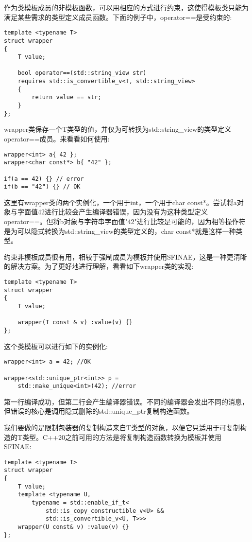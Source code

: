 作为类模板成员的非模板函数，可以用相应的方式进行约束，这使得模板类只能为满足某些需求的类型定义成员函数。下面的例子中，operator==是受约束的:

\begin{lstlisting}[style=styleCXX]
template <typename T>
struct wrapper
{
	T value;
	
	bool operator==(std::string_view str)
	requires std::is_convertible_v<T, std::string_view>
	{
		return value == str;
	}
};
\end{lstlisting}

wrapper类保存一个T类型的值，并仅为可转换为std::string\_view的类型定义operator==成员。来看看如何使用:

\begin{lstlisting}[style=styleCXX]
wrapper<int> a{ 42 };
wrapper<char const*> b{ "42" };

if(a == 42) {} // error
if(b == "42") {} // OK
\end{lstlisting}

这里有wrapper类的两个实例化，一个用于int，一个用于char const*。尝试将a对象与字面值42进行比较会产生编译器错误，因为没有为这种类型定义operator==。但将b对象与字符串字面值"42"进行比较是可能的，因为相等操作符是为可以隐式转换为std::string\_view的类型定义的，char const*就是这样一种类型。

约束非模板成员很有用，相较于强制成员为模板并使用SFINAE，这是一种更清晰的解决方案。为了更好地进行理解，看看如下wrapper类的实现:

\begin{lstlisting}[style=styleCXX]
template <typename T>
struct wrapper
{
	T value;
	
	wrapper(T const & v) :value(v) {}
};
\end{lstlisting}

这个类模板可以进行如下的实例化:

\begin{lstlisting}[style=styleCXX]
wrapper<int> a = 42; //OK

wrapper<std::unique_ptr<int>> p =
	std::make_unique<int>(42); //error
\end{lstlisting}

第一行编译成功，但第二行会产生编译器错误。不同的编译器会发出不同的消息，但错误的核心是调用隐式删除的std::unique\_ptr复制构造函数。

我们要做的是限制包装器的复制构造来自T类型的对象，以便它只适用于可复制构造的T类型。C++20之前可用的方法是将复制构造函数转换为模板并使用SFINAE:

\begin{lstlisting}[style=styleCXX]
template <typename T>
struct wrapper
{
	T value;
	template <typename U,
		typename = std::enable_if_t<
			std::is_copy_constructible_v<U> &&
			std::is_convertible_v<U, T>>>
	wrapper(U const& v) :value(v) {}
};
\end{lstlisting}

